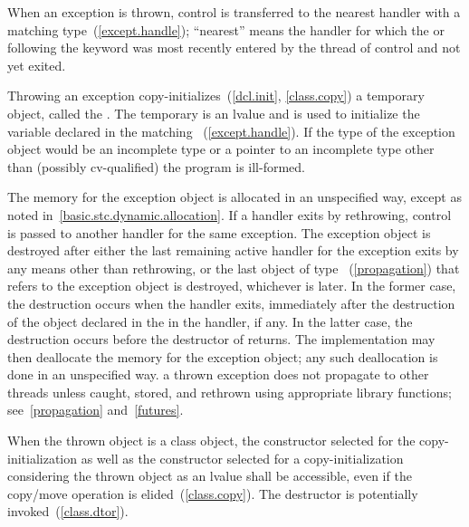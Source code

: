 \pnum
{}%
%
%
When an exception is thrown, control is transferred to the nearest handler with
a matching type~(\ref{except.handle}); ``nearest'' means the handler
for which the
 or
following the
keyword was most recently entered by the thread of control and not yet exited.

\pnum
Throwing an exception
copy-initializes~(\ref{dcl.init}, \ref{class.copy}) a temporary object,
called the
.
The temporary is an lvalue and is used to initialize the
variable declared in the matching
~(\ref{except.handle}).
If the type of the exception object would
be an incomplete type or a pointer to an incomplete
type other than (possibly cv-qualified)
 the program is ill-formed.

\pnum
{}%
%
%
The memory for the exception object is
allocated in an unspecified way, except as noted in~\ref{basic.stc.dynamic.allocation}.
If a handler exits by rethrowing, control is passed to another handler for
the same exception.
The exception object is destroyed after either
the last remaining active handler for the exception exits by
any means other than
rethrowing, or the last object of type ~(\ref{propagation})
that refers to the exception object is destroyed, whichever is later. In the former
case, the destruction occurs when the handler exits, immediately after the destruction
of the object declared in the  in the handler, if any.
In the latter case, the destruction occurs before the destructor of 
returns.
The implementation may then
deallocate the memory for the exception object; any such deallocation
is done in an unspecified way.
\enternote a thrown exception does not
propagate to other threads unless caught, stored, and rethrown using
appropriate library functions; see~\ref{propagation} and~\ref{futures}. \exitnote

\pnum
{}%
%
When the thrown object is a class object, the constructor selected for
the copy-initialization as well as the constructor selected for
a copy-initialization considering the thrown object as an lvalue
shall be accessible, even if the copy/move operation is
elided~(\ref{class.copy}).
The destructor is potentially invoked~(\ref{class.dtor}).

